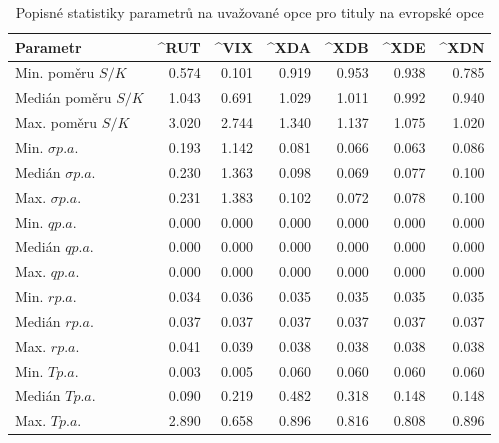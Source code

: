 \documentclass[male,czech,api_bc]{kitheses}
\begin{document}
  \begin{table}[h!]
    \centering
    \caption{Popisné statistiky parametrů na uvažované opce pro tituly na evropské opce}
    \label{tab:descriptive_european}
    \begin{tabular}{lrrrrrr}
      \toprule
      Parametr & \textasciicircum{}RUT & \textasciicircum{}VIX & \textasciicircum{}XDA & \textasciicircum{}XDB & \textasciicircum{}XDE & \textasciicircum{}XDN \\
      \midrule
      Min. poměru $S/K$ & 0.574 & 0.101 & 0.919 & 0.953 & 0.938 & 0.785 \\
      Medián poměru $S/K$ & 1.043 & 0.691 & 1.029 & 1.011 & 0.992 & 0.940 \\
      Max. poměru $S/K$ & 3.020 & 2.744 & 1.340 & 1.137 & 1.075 & 1.020 \\
      \midrule
      Min. $\sigma p.a.$ & 0.193 & 1.142 & 0.081 & 0.066 & 0.063 & 0.086 \\
      Medián $\sigma p.a.$ & 0.230 & 1.363 & 0.098 & 0.069 & 0.077 & 0.100 \\
      Max. $\sigma p.a.$ & 0.231 & 1.383 & 0.102 & 0.072 & 0.078 & 0.100 \\
      \midrule
      Min. $q p.a.$ & 0.000 & 0.000 & 0.000 & 0.000 & 0.000 & 0.000 \\
      Medián $q p.a.$ & 0.000 & 0.000 & 0.000 & 0.000 & 0.000 & 0.000 \\
      Max. $q p.a.$ & 0.000 & 0.000 & 0.000 & 0.000 & 0.000 & 0.000 \\
      \midrule
      Min. $r p.a.$ & 0.034 & 0.036 & 0.035 & 0.035 & 0.035 & 0.035 \\
      Medián $r p.a.$ & 0.037 & 0.037 & 0.037 & 0.037 & 0.037 & 0.037 \\
      Max. $r p.a.$ & 0.041 & 0.039 & 0.038 & 0.038 & 0.038 & 0.038 \\
      \midrule
      Min. $T p.a.$ & 0.003 & 0.005 & 0.060 & 0.060 & 0.060 & 0.060 \\
      Medián $T p.a.$ & 0.090 & 0.219 & 0.482 & 0.318 & 0.148 & 0.148 \\
      Max. $T p.a.$ & 2.890 & 0.658 & 0.896 & 0.816 & 0.808 & 0.896 \\
      \bottomrule
    \end{tabular}
  \end{table}
\end{document}
